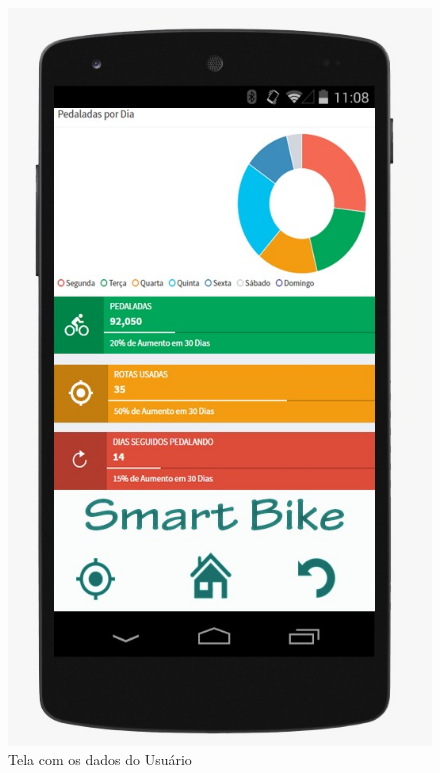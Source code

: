 	\graphicspath{{figuras/}}
	\begin{figure}[h!]
	\centering
	\includegraphics[scale=0.40]{dashboard.jpeg}
	\caption{Tela com os dados do Usuário}
	\label{img:dados}
	\end{figure}
	
